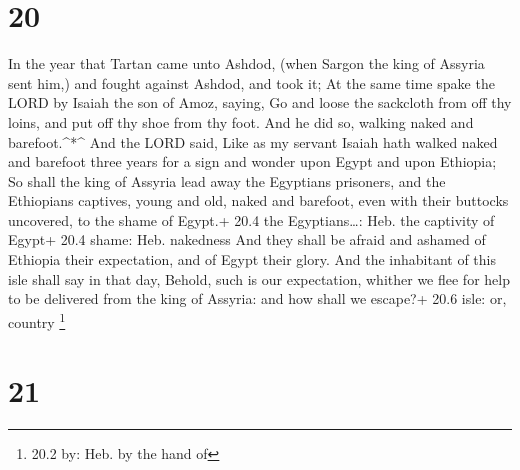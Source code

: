 \hypertarget{section-19}{%
\section{20}\label{section-19}}

 In the year that Tartan came unto Ashdod, (when Sargon the
king of Assyria sent him,) and fought against Ashdod, and took it;
 At the same time spake the LORD by Isaiah the son of Amoz,
saying, Go and loose the sackcloth from off thy loins, and put off thy
shoe from thy foot. And he did so, walking naked and barefoot.\^{}*\^{}
 And the LORD said, Like as my servant Isaiah hath walked
naked and barefoot three years for a sign and wonder upon Egypt and upon
Ethiopia;  So shall the king of Assyria lead away the
Egyptians prisoners, and the Ethiopians captives, young and old, naked
and barefoot, even with their buttocks uncovered, to the shame of
Egypt.+ 20.4 the Egyptians\ldots: Heb. the captivity of Egypt+ 20.4
shame: Heb. nakedness  And they shall be afraid and ashamed
of Ethiopia their expectation, and of Egypt their glory. 
And the inhabitant of this isle shall say in that day, Behold, such is
our expectation, whither we flee for help to be delivered from the king
of Assyria: and how shall we escape?+ 20.6 isle: or, country \footnote{20.2
  by: Heb. by the hand of}

\hypertarget{section-20}{%
\section{21}\label{section-20}}

